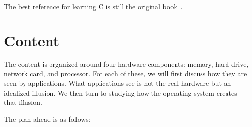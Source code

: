 \smallskip

The best reference for learning C is still the original book~\citep{c-book}.

\section{Content}

The content is organized around four hardware components:
  memory, hard drive, network card, and processor.
For each of these,
  we will first discuss how they are seen by applications.
What applications see is not the real hardware but an idealized illusion.
We then turn to studying how the operating system creates that illusion.

The plan ahead is as follows:


